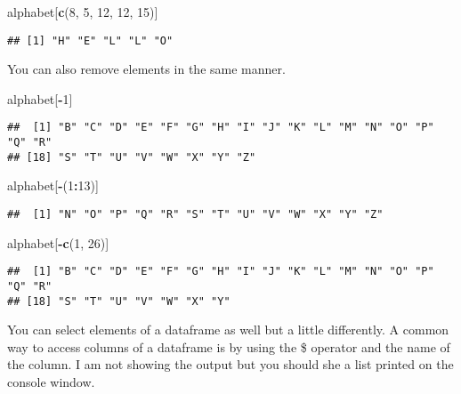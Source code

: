 \documentclass[]{article}
\newenvironment{Shaded}{\begin{snugshade}}{\end{snugshade}}
\newcommand{\KeywordTok}[1]{\textcolor[rgb]{0.13,0.29,0.53}{\textbf{#1}}}
\newcommand{\DecValTok}[1]{\textcolor[rgb]{0.00,0.00,0.81}{#1}}
\newcommand{\OperatorTok}[1]{\textcolor[rgb]{0.81,0.36,0.00}{\textbf{#1}}}
\newcommand{\NormalTok}[1]{#1}
\begin{document}
\begin{Shaded}
\begin{Highlighting}[]
\NormalTok{alphabet[}\KeywordTok{c}\NormalTok{(}\DecValTok{8}\NormalTok{, }\DecValTok{5}\NormalTok{, }\DecValTok{12}\NormalTok{, }\DecValTok{12}\NormalTok{, }\DecValTok{15}\NormalTok{)]}
\end{Highlighting}
\end{Shaded}

\begin{verbatim}
## [1] "H" "E" "L" "L" "O"
\end{verbatim}

You can also remove elements in the same manner.

\begin{Shaded}
\begin{Highlighting}[]
\NormalTok{alphabet[}\OperatorTok{-}\DecValTok{1}\NormalTok{]}
\end{Highlighting}
\end{Shaded}

\begin{verbatim}
##  [1] "B" "C" "D" "E" "F" "G" "H" "I" "J" "K" "L" "M" "N" "O" "P" "Q" "R"
## [18] "S" "T" "U" "V" "W" "X" "Y" "Z"
\end{verbatim}

\begin{Shaded}
\begin{Highlighting}[]
\NormalTok{alphabet[}\OperatorTok{-}\NormalTok{(}\DecValTok{1}\OperatorTok{:}\DecValTok{13}\NormalTok{)]}
\end{Highlighting}
\end{Shaded}

\begin{verbatim}
##  [1] "N" "O" "P" "Q" "R" "S" "T" "U" "V" "W" "X" "Y" "Z"
\end{verbatim}

\begin{Shaded}
\begin{Highlighting}[]
\NormalTok{alphabet[}\OperatorTok{-}\KeywordTok{c}\NormalTok{(}\DecValTok{1}\NormalTok{, }\DecValTok{26}\NormalTok{)]}
\end{Highlighting}
\end{Shaded}

\begin{verbatim}
##  [1] "B" "C" "D" "E" "F" "G" "H" "I" "J" "K" "L" "M" "N" "O" "P" "Q" "R"
## [18] "S" "T" "U" "V" "W" "X" "Y"
\end{verbatim}

You can select elements of a dataframe as well but a little differently.
A common way to access columns of a dataframe is by using the \$
operator and the name of the column. I am not showing the output but you
should she a list printed on the console window.
\end{document}
